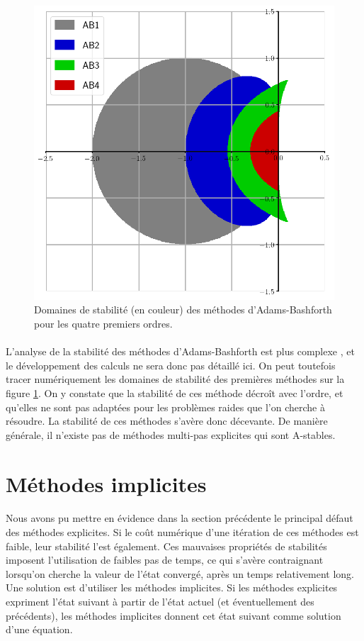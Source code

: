     \begin{figure}
      \centering
      \includegraphics[width=.6\textwidth]{images/ab_stab.png}
      \caption{Domaines de stabilité (en couleur) des méthodes d'Adams-Bashforth pour les quatre premiers ordres.}
      \label{fig:ab_stab}
    \end{figure}

    \paragraph{}
    L'analyse de la stabilité des méthodes d'Adams-Bashforth est plus complexe \cite{HairerNorsettWanner1993, HairerWanner1996}, et le développement des calculs ne sera donc pas détaillé ici.
    On peut toutefois tracer numériquement les domaines de stabilité des premières méthodes sur la figure \ref{fig:ab_stab}.
    On y constate que la stabilité de ces méthode décroît avec l'ordre, et qu'elles ne sont pas adaptées pour les problèmes raides que l'on cherche à résoudre.
    La stabilité de ces méthodes s'avère donc décevante.
    De manière générale, il n'existe pas de méthodes multi-pas explicites qui sont A-stables.


\section{Méthodes implicites}

  \paragraph{}
  Nous avons pu mettre en évidence dans la section précédente le principal défaut des méthodes explicites.
  Si le coût numérique d'une itération de ces méthodes est faible, leur stabilité l'est également.
  Ces mauvaises propriétés de stabilités imposent l'utilisation de faibles pas de temps, ce qui s'avère contraignant lorsqu'on cherche la valeur de l'état convergé, après un temps relativement long.
  Une solution est d'utiliser les méthodes implicites.
  Si les méthodes explicites expriment l'état suivant à partir de l'état actuel (et éventuellement des précédents), les méthodes implicites donnent cet état suivant comme solution d'une équation.

